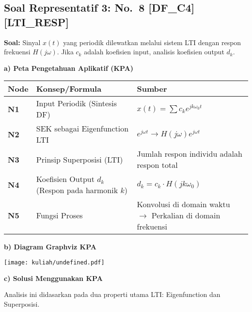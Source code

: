 \documentclass[
  letterpaper,
  DIV=11,
  numbers=noendperiod]{scrreprt}
\begin{document}
\subsection{Soal Representatif 3: No.~8
{[}DF\_C4{]}{[}LTI\_RESP{]}}\label{soal-representatif-3-no.-8-df_c4lti_resp}

\textbf{Soal:} Sinyal \(x(t)\) yang periodik dilewatkan melalui sistem
LTI dengan respon frekuensi \(H(j\omega)\). Jika \(c_k\) adalah
koefisien input, analisis koefisien output \(d_k\).

\textbf{a) Peta Pengetahuan Aplikatif (KPA)}

\begin{longtable}[]{@{}
  >{\centering\arraybackslash}p{}
  >{\raggedright\arraybackslash}p{}
  >{\raggedright\arraybackslash}p{}@{}}
\toprule\noalign{}
\begin{minipage}[b]{\linewidth}\centering
Node
\end{minipage} & \begin{minipage}[b]{\linewidth}\raggedright
Konsep/Formula
\end{minipage} & \begin{minipage}[b]{\linewidth}\raggedright
Sumber
\end{minipage} \\
\midrule\noalign{}
\endhead
\bottomrule\noalign{}
\endlastfoot
\textbf{N1} & Input Periodik (Sintesis DF) &
\(x(t) = \sum c_k e^{jk\omega_0 t}\) \\
\textbf{N2} & SEK sebagai Eigenfunction LTI &
\(e^{j\omega t} \rightarrow H(j\omega) e^{j\omega t}\) \\
\textbf{N3} & Prinsip Superposisi (LTI) & Jumlah respon individu adalah
respon total \\
\textbf{N4} & Koefisien Output \(d_k\) (Respon pada harmonik \(k\)) &
\(d_k = c_k \cdot H(jk\omega_0)\) \\
\textbf{N5} & Fungsi Proses & Konvolusi di domain waktu \(\rightarrow\)
Perkalian di domain frekuensi \\
\end{longtable}

\textbf{b) Diagram Graphviz KPA}

\texttt{[image: kuliah/undefined.pdf]}

\textbf{c) Solusi Menggunakan KPA}

Analisis ini didasarkan pada dua properti utama LTI: Eigenfunction dan
Superposisi.
\end{document}
